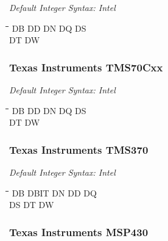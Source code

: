 {\em Default Integer Syntax: Intel}

{\tt\begin{tabbing}
\hspace{3cm}\=\hspace{3cm}\=\hspace{3cm}\=\hspace{3cm}\=\kill
DB         \> DD          \> DN          \> DQ          \> DS \\
DT         \> DW \\
\end{tabbing}}

\subsubsection{Texas Instruments TMS70Cxx}

{\em Default Integer Syntax: Intel}

{\tt\begin{tabbing}
\hspace{3cm}\=\hspace{3cm}\=\hspace{3cm}\=\hspace{3cm}\=\kill
DB         \> DD          \> DN          \> DQ          \> DS \\
DT         \> DW \\
\end{tabbing}}

\subsubsection{Texas Instruments TMS370}

{\em Default Integer Syntax: Intel}

{\tt\begin{tabbing}
\hspace{3cm}\=\hspace{3cm}\=\hspace{3cm}\=\hspace{3cm}\=\kill
DB         \> DBIT        \> DN          \> DD          \> DQ \\
DS         \> DT          \> DW \\
\end{tabbing}}

\subsubsection{Texas Instruments MSP430}

